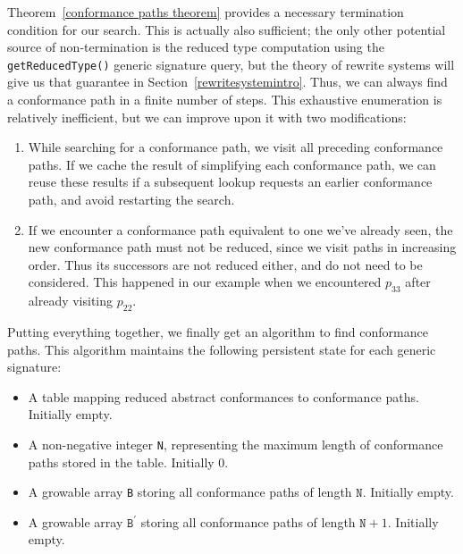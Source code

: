 \documentclass[../generics]{subfiles}
\begin{document}
Theorem~\ref{conformance paths theorem} provides a necessary termination condition for our search. This is actually also sufficient; the only other potential source of non-termination is the reduced type computation using the \texttt{getReducedType()} generic signature query, but the theory of rewrite systems will give us that guarantee in Section~\ref{rewritesystemintro}. Thus, we can always find a conformance path in a finite number of steps. This exhaustive enumeration is relatively inefficient, but we can improve upon it with two modifications:
\begin{enumerate}
\item While searching for a conformance path, we visit all preceding conformance paths. If we cache the result of simplifying each conformance path, we can reuse these results if a subsequent lookup requests an earlier conformance path, and avoid restarting the search.
\item If we encounter a conformance path equivalent to one we've already seen, the new conformance path must not be reduced, since we visit paths in increasing order. Thus its successors are not reduced either, and do not need to be considered. This happened in our example when we encountered $p_{33}$ after already visiting $p_{22}$.
\end{enumerate}
Putting everything together, we finally get an algorithm to find conformance paths. This algorithm maintains the following persistent state for each generic signature:
\begin{itemize}
\item A table mapping reduced abstract conformances to conformance paths. Initially empty.
\item A non-negative integer \texttt{N}, representing the maximum length of conformance paths stored in the table. Initially 0.
\item A growable array \texttt{B} storing all conformance paths of length $\texttt{N}$. Initially empty.
\item A growable array $\texttt{B}^\prime$ storing all conformance paths of length $\texttt{N}+1$. Initially empty.
\end{itemize}
\end{document}
